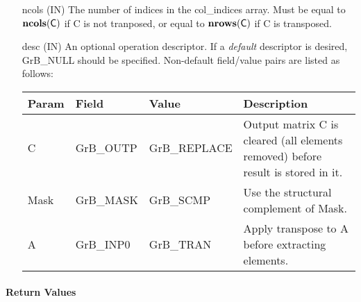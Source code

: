\begin{itemize}[leftmargin=1in]
    \item[{\sf ncols}] ({\sf IN}) The number of indices in the {\sf col\_indices}
    array.  Must be equal to $\bold{ncols}({\sf C})$ if {\sf C} is not tranposed,
	or equal to $\bold{nrows}({\sf C})$ if {\sf C} is transposed.

    \item[{\sf desc}] ({\sf IN}) An optional operation descriptor. If
    a \emph{default} descriptor is desired, {\sf GrB\_NULL} should be
    specified. Non-default field/value pairs are listed as follows:  \\

    \begin{tabular}{lllp{2.5in}}
        Param & Field  & Value & Description \\
        \hline
        {\sf C}    & {\sf GrB\_OUTP} & {\sf GrB\_REPLACE} & Output matrix {\sf C} 
        is cleared (all elements removed) before result is stored in it. \\
    
        {\sf Mask} & {\sf GrB\_MASK} & {\sf GrB\_SCMP}   & Use the structural 
        complement of {\sf Mask}. \\
    
        {\sf A}    & {\sf GrB\_INP0} & {\sf GrB\_TRAN}   & Apply transpose to 
        {\sf A} before extracting elements. \\
    \end{tabular}
\end{itemize}

\paragraph{Return Values}

